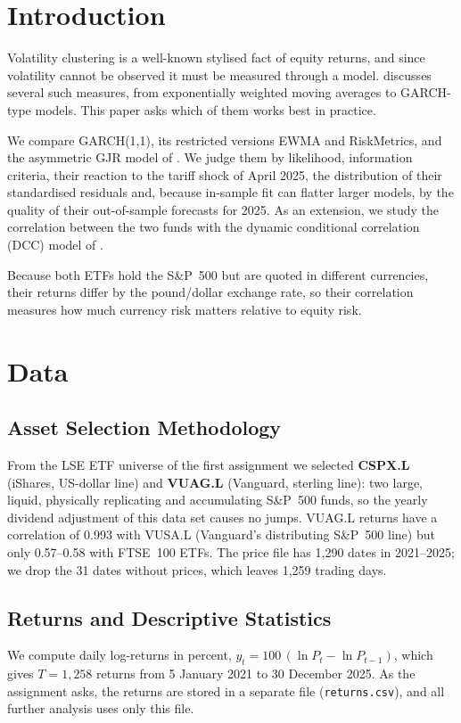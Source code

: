 \documentclass[10pt,a4paper]{article}
\begin{document}
\section{Introduction}
Volatility clustering is a well-known stylised fact of equity returns, and since volatility cannot be
observed it must be measured through a model. \citet[Chapter~9]{brooks2019} discusses several such
measures, from exponentially weighted moving averages to GARCH-type models. This paper asks which of them
works best in practice.

We compare GARCH(1,1), its restricted versions EWMA and RiskMetrics, and the asymmetric GJR model of
\citet{glosten1993}. We judge them by likelihood, information criteria, their reaction to the tariff
shock of April 2025, the distribution of their standardised residuals and, because in-sample fit can
flatter larger models, by the quality of their out-of-sample forecasts for 2025. As an extension, we study the
correlation between the two funds with the dynamic conditional correlation (DCC) model of
\citet{engle2002}.

Because both ETFs hold the S\&P~500 but are quoted in different currencies, their returns differ by the
pound/dollar exchange rate, so their correlation measures how much currency risk matters relative to
equity risk.

\section{Data}\label{sec:data}

\subsection{Asset Selection Methodology}
From the LSE ETF universe of the first assignment we selected \textbf{CSPX.L} (iShares, US-dollar line) and
\textbf{VUAG.L} (Vanguard, sterling line): two large, liquid, physically replicating and accumulating
S\&P~500 funds, so the yearly dividend adjustment of this data set causes no jumps. VUAG.L returns have a
correlation of 0.993 with VUSA.L (Vanguard's distributing S\&P~500 line) but only 0.57--0.58 with FTSE~100
ETFs. The price file has 1,290 dates in 2021--2025; we drop the 31 dates without prices, which leaves
1,259 trading days.

\subsection{Returns and Descriptive Statistics}
We compute daily log-returns in percent, $y_t = 100\,(\ln P_t - \ln P_{t-1})$, which gives $T=1{,}258$
returns from 5 January 2021 to 30 December 2025. As the assignment asks, the returns are stored in a
separate file (\texttt{returns.csv}), and all further analysis uses only this file.
\end{document}
